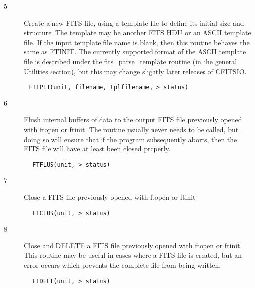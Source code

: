 \documentclass[11pt]{book}
\begin{document}
\begin{description}
\item[5 ]  Create a new FITS file, using a template file to define its
  initial size and structure.  The template may be another FITS HDU
  or an ASCII template file.  If the input template file name
  is blank, then this routine behaves the same as FTINIT.
  The currently supported format of the ASCII template file is described
  under the fits\_parse\_template routine (in the general Utilities
  section), but this may change slightly later releases of
 CFITSIO.
\end{description}

\begin{verbatim}
       FTTPLT(unit, filename, tplfilename, > status)
\end{verbatim}

\begin{description}
\item[6 ]Flush internal buffers of data to the output FITS file
   previously opened with ftopen or ftinit.  The routine usually
   never needs to be called, but doing so will ensure that
   if the program subsequently aborts, then the FITS file will
  have at least been closed properly.
\end{description}

\begin{verbatim}
        FTFLUS(unit, > status)
\end{verbatim}

\begin{description}
\item[7 ]Close a FITS file previously opened with ftopen or ftinit
\end{description}

\begin{verbatim}
        FTCLOS(unit, > status)
\end{verbatim}

\begin{description}
\item[8 ] Close and DELETE a FITS file previously opened with ftopen or ftinit.
    This routine may be  useful in cases where a FITS file is created, but
   an error occurs which prevents the complete file from being written.
\end{description}

\begin{verbatim}
        FTDELT(unit, > status)
\end{verbatim}
\end{document}
